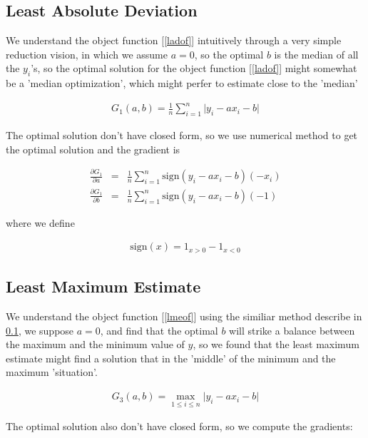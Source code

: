 \documentclass[twoside]{article}
\begin{document}
\subsection{Least Absolute Deviation}
\label{lad}

We understand the object function [\ref{ladof}] intuitively through a very simple reduction vision, in which we assume $a=0$, so the optimal $b$ is the median of all the $y_i$'s, so the optimal solution for the object function [\ref{ladof}] might somewhat be a 'median optimization', which might perfer to estimate close to the 'median'

\begin{eqnarray}
\label{ladof}
  G_1(a,b)=\frac{1}{n}\sum_{i=1}^n{\lvert y_i - a x_i - b\rvert}
\end{eqnarray}

The optimal solution don't have closed form, so we use numerical method to get the optimal solution and the gradient is

\begin{eqnarray}
  \frac{\partial G_1}{\partial a}&=&\frac{1}{n}\sum_{i=1}^n{\mathrm{sign}(y_i-a x_i - b)(-x_i)} \\
  \frac{\partial G_1}{\partial b}&=&\frac{1}{n}\sum_{i=1}^n{\mathrm{sign}(y_i-a x_i - b)(-1)} 
\end{eqnarray}

where we define

\begin{eqnarray}
\mathrm{sign}(x) = 1_{x>0} - 1_{x<0}
\end{eqnarray}

\subsection{Least Maximum Estimate}

We understand the object function [\ref{lmeof}] using the similiar method describe in \ref{lad}, we suppose $a=0$, and find that the optimal $b$ will strike a balance between the maximum and the minimum value of $y$, so we found that the least maximum estimate might find a solution that in the 'middle' of the minimum and the maximum 'situation'.

\begin{eqnarray}
\label{lmeof}
G_3(a,b)=\max_{1 \le i\le n}{\lvert y_i - a x_i - b\rvert}
\end{eqnarray}

The optimal solution also don't have closed form, so we compute the gradients:
\end{document}
